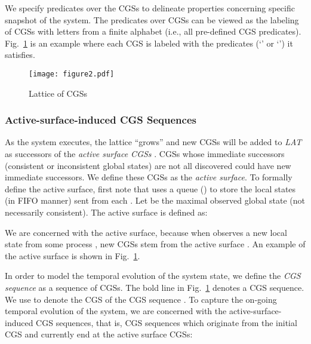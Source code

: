 \documentclass[10pt,conference,compsocconf,letterpaper]{IEEEtran}
\begin{document}
We specify predicates over the CGSs to delineate properties concerning specific snapshot of the system. The predicates over CGSs can be viewed as the labeling of CGSs with letters from a finite alphabet  (i.e., all pre-defined CGS predicates). Fig.~\ref{F:Lattice} is an example where each CGS is labeled with the predicates (`' or `') it satisfies.
\begin{figure}[tbp]
\begin{center}
  \texttt{[image: figure2.pdf]}
  \caption{Lattice of CGSs}
  \label{F:Lattice}
\end{center}
\end{figure}

\subsubsection{Active-surface-induced CGS Sequences}

\iffalse
To capture runtime evolution of the system state, we are concerned with the \textit{surface CGSs} in the lattice. Informally, surface CGSs are on the boundary of the currently-observed lattice \cite{Yang13}. To formally define the surface, first note that  uses a queue () to store the local states (in FIFO manner) sent from each  \cite{Garg96, Huang12, Hua10}. Let  be the currently-observed lattice,  be the maximal CGS, and  be the maximal global state (not necessarily consistent). The surface of  is defined as 
\noindent Refer to the geometric illustration in Fig.~\ref{F:Lattice}, the current , , and .
\fi

As the system executes, the lattice ``grows'' and new CGSs will be added to {\it LAT} as successors of the \textit{active surface CGSs} \cite{Yang13}. CGSs whose immediate successors (consistent or inconsistent global states) are not all discovered could have new immediate successors. We define these CGSs as the \textit{active surface}. To formally define the active surface, first note that  uses a queue () to store the local states (in FIFO manner) sent from each  \cite{Garg96, Huang12, Yang13}. Let  be the maximal observed global state (not necessarily consistent). The active surface is defined as:

We are concerned with the active surface, because when  observes a new local state from some process , new CGSs stem from the active surface \cite{Yang13}. An example of the active surface is shown in Fig.~\ref{F:Lattice}.

In order to model the temporal evolution of the system state, we define the {\it CGS sequence}  as a sequence of CGSs. The bold line in Fig.~\ref{F:Lattice} denotes a CGS sequence. We use  to denote the  CGS of the CGS sequence .
\iffalse
To capture the on-going temporal evolution of the system, we are concerned with the active-surface-induced CGS sequences, that is, CGS sequences which originate from the initial CGS and currently end at the active surface CGSs:
\end{document}
